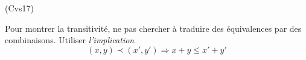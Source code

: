 \begin{tiny}(Cvs17)\end{tiny} Pour montrer la transitivité, ne pas chercher à traduire des équivalences par des combinaisons. Utiliser \emph{l'implication} 
\begin{displaymath}
 (x,y)\prec (x',y')\Rightarrow x+y \leq x'+y'
\end{displaymath}
 